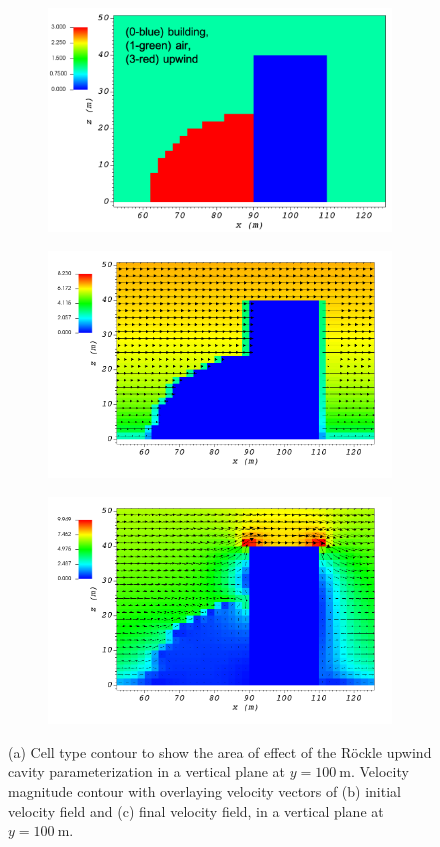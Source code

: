 \begin{figure}[H]
    \centering
    \begin{subfigure}{\textwidth}
    \centering
    \includegraphics[width=10.3cm,keepaspectratio]{Images/upwind_y_100_1_init_icell.png}
    \caption{}
    \end{subfigure}
    \begin{subfigure}{\textwidth}
    \centering
    \includegraphics[width=11.0cm,keepaspectratio]{Images/upwind_y_100_1_init_vel.png}
    \caption{}
    \end{subfigure}
    \begin{subfigure}{\textwidth}
    \centering
    \includegraphics[width=11.0cm,keepaspectratio]{Images/upwind_y_100_1_final.png}
    \caption{}
    \end{subfigure}
    \caption{(a) Cell type contour to show the area of effect of the R\"{o}ckle upwind cavity parameterization in a vertical plane at $y=100\ \si{\meter}$. Velocity magnitude contour with overlaying velocity vectors of (b) initial velocity field and (c) final velocity field, in a vertical plane at $y=100\ \si{\meter}$.}
\end{figure}

